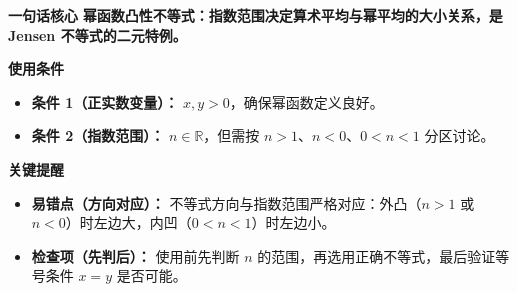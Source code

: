 \begin{summarybox}
\textbf{\textcolor{CSummary}{一句话核心}}
\textbf{幂函数凸性不等式：指数范围决定算术平均与幂平均的大小关系，是 Jensen 不等式的二元特例。}

\medskip
\textbf{\textcolor{CSummary}{使用条件}}
\begin{itemize}[leftmargin=*, itemsep=0.5em, topsep=0.4em]
    \item \textbf{条件 1（正实数变量）：} $x, y > 0$，确保幂函数定义良好。
    \item \textbf{条件 2（指数范围）：} $n \in \mathbb{R}$，但需按 $n>1$、$n<0$、$0<n<1$ 分区讨论。
\end{itemize}

\medskip
\textbf{\textcolor{CSummary}{关键提醒}}
\begin{itemize}[leftmargin=*, itemsep=0.5em, topsep=0.4em]
    \item \textbf{易错点（方向对应）：} 不等式方向与指数范围严格对应：外凸（$n>1$ 或 $n<0$）时左边大，内凹（$0<n<1$）时左边小。
    \item \textbf{检查项（先判后）：} 使用前先判断 $n$ 的范围，再选用正确不等式，最后验证等号条件 $x=y$ 是否可能。
\end{itemize}

\end{summarybox}
